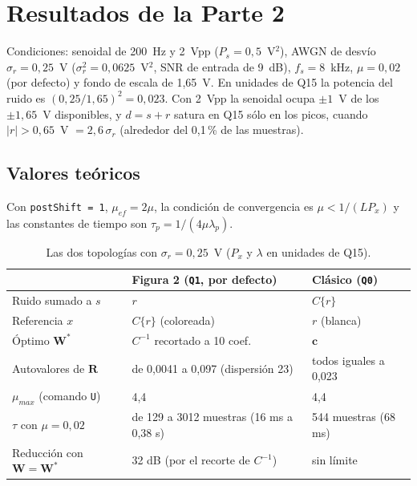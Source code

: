 \documentclass[11pt,a4paper]{article}
\begin{document}
\section{Resultados de la Parte 2}
Condiciones: senoidal de 200~Hz y 2~Vpp ($P_s = 0{,}5$~V$^2$), AWGN de desvío
$\sigma_r = 0{,}25$~V ($\sigma_r^2 = 0{,}0625$~V$^2$, SNR de entrada de 9~dB), $f_s = 8$~kHz,
$\mu = 0{,}02$ (por defecto) y fondo de escala de 1,65~V. En unidades de Q15 la potencia del ruido
es $(0{,}25/1{,}65)^2 = 0{,}023$. Con 2~Vpp la senoidal ocupa $\pm1$~V de los $\pm1{,}65$~V
disponibles, y $d = s + r$ satura en Q15 sólo en los picos, cuando $|r| > 0{,}65$~V $= 2{,}6\,\sigma_r$
(alrededor del 0,1\,\% de las muestras).

\subsection{Valores teóricos}
Con \texttt{postShift = 1}, $\mu_{ef} = 2\mu$, la condición de convergencia es
$\mu < 1/(L P_x)$ y las constantes de tiempo son $\tau_p = 1/(4\mu\lambda_p)$.

\begin{table}[H]
\centering
\caption{Las dos topologías con $\sigma_r = 0{,}25$~V ($P_x$ y $\lambda$ en unidades de Q15).}
\label{tab:p2teo}
\small
\begin{tabular}{lll}
\toprule
 & Figura 2 (\texttt{Q1}, por defecto) & Clásico (\texttt{Q0}) \\
\midrule
Ruido sumado a $s$ & $r$ & $C\{r\}$ \\
Referencia $x$ & $C\{r\}$ (coloreada) & $r$ (blanca) \\
Óptimo $\mathbf{W}^*$ & $C^{-1}$ recortado a 10 coef. & $\mathbf{c}$ \\
Autovalores de $\mathbf{R}$ & de 0,0041 a 0,097 (dispersión 23) & todos iguales a 0,023 \\
$\mu_{max}$ (comando \texttt{U}) & 4,4 & 4,4 \\
$\tau$ con $\mu = 0{,}02$ & de 129 a 3012 muestras (16 ms a 0,38 s) & 544 muestras (68 ms) \\
Reducción con $\mathbf{W} = \mathbf{W}^*$ & 32 dB (por el recorte de $C^{-1}$) & sin límite \\
\bottomrule
\end{tabular}
\end{table}
\end{document}

